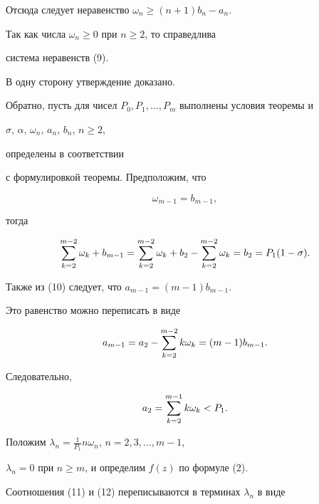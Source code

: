 Отсюда следует неравенство $\omega_n\geq (n+1)b_n-a_n$.


Так как числа $\omega_n\geq 0$ при $n\geq 2$, то справедлива


система неравенств (9).


В одну сторону утверждение доказано.





Обратно, пусть для чисел $P_0, P_1, \dotsc, P_m$ выполнены условия теоремы и


$\sigma$, $\alpha$, $\omega_n$, $a_n$, $b_n$, $n\geq 2$,


определены в соответствии


с формулировкой теоремы. Предположим, что


\begin{equation}


\omega_{m-1}=b_{m-1},


\end{equation}


тогда


\begin{equation}


\Su {k=2}^{m-2}\omega_k+b_{m-1}=\Su {k=2}^{m-2}\omega_k+b_2-


\Su {k=2}^{m-2}\omega_k=b_2=P_1(1-\sigma).


\end{equation}


Также из (10) следует, что $a_{m-1}=(m-1)b_{m-1}$.


Это равенство можно переписать в виде


$$


a_{m-1}=a_2-\Su {k=2}^{m-2}k\omega_k=(m-1)b_{m-1}.


$$


Следовательно,


\begin{equation}


a_2=\Su {k=2}^{m-1}k\omega_k<P_1.


\end{equation}


Положим $\lambda_n={\frac 1{P_1}}n\omega_n$, $n=2, 3, \dotsc,m-1$,


$\lambda_n=0$  при $n\geq m$, и определим $f(z)$  по формуле (2).





Соотношения (11) и (12) переписываются в терминах $\lambda_n$ в виде


$$


